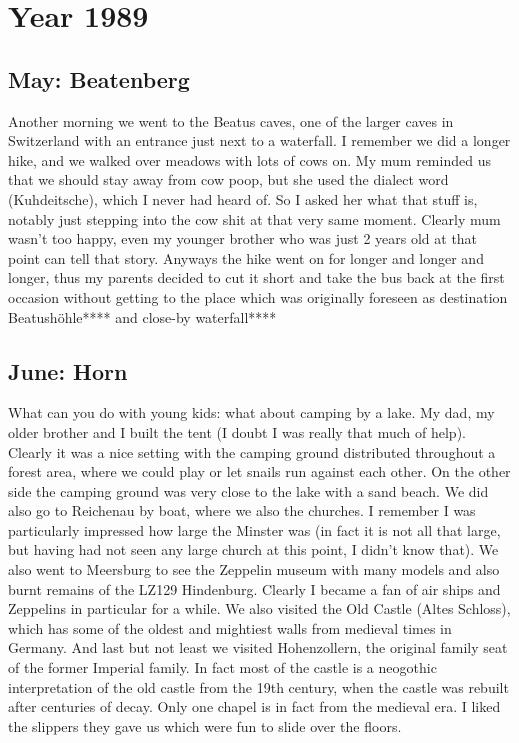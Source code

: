 \chapter{Year 1989}
\label{1989}

\section{May: Beatenberg}
\label{1989:Beatenberg}


Another morning we went to the Beatus caves, one of the larger caves in Switzerland with an entrance just next to a waterfall. I remember we did a longer hike, and we walked over meadows with lots of cows on. My mum reminded us that we should stay away from cow poop, but she used the dialect word (Kuhdeitsche), which I never had heard of. So I asked her what that stuff is, notably just stepping into the cow shit at that very same moment. Clearly mum wasn't too happy, even my younger brother who was just 2 years old at that point can tell that story. Anyways the hike went on for longer and longer and longer, thus my parents decided to cut it short and take the bus back at the first occasion without getting to the place which was originally foreseen as destination\\

Beatush\"ohle**** and close-by waterfall****

\section{June: Horn}
\label{1989:Horn}

What can you do with young kids: what about camping by a lake. My dad, my older brother and I built the tent (I doubt I was really that much of help). Clearly it was a nice setting with the camping ground distributed throughout a forest area, where we could play or let snails run against each other. On the other side the camping ground was very close to the lake with a sand beach. We did also go to Reichenau by boat, where we also the churches. I remember I was particularly impressed how large the Minster was (in fact it is not all that large, but having had not seen any large church at this point, I didn't know that). We also went to Meersburg to see the Zeppelin museum with many models and also burnt remains of the LZ129 Hindenburg. Clearly I became a fan of air ships and Zeppelins in particular for a while. We also visited the Old Castle (Altes Schloss), which has some of the oldest and mightiest walls from medieval times in Germany. And last but not least we visited Hohenzollern, the original family seat of the former Imperial family. In fact most of the castle is a neogothic interpretation of the old castle from the 19th century, when the castle was rebuilt after centuries of decay. Only one chapel is in fact from the medieval era. I liked the slippers they gave us which were fun to slide over the floors.

